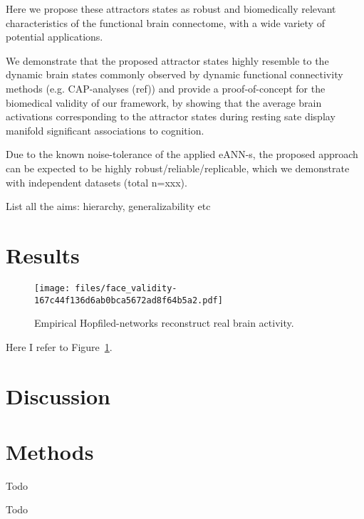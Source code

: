 \documentclass{article}
\begin{document}
Here we propose these attractors states as robust and biomedically relevant characteristics of the functional brain connectome, with a wide variety of potential applications.

We demonstrate that the proposed attractor states highly resemble to the dynamic brain states commonly observed by dynamic functional connectivity methods (e.g. CAP-analyses (ref)) and provide a proof-of-concept for the biomedical validity of our framework, by showing that the average brain activations corresponding to the attractor states during resting sate display manifold significant associations to cognition.

Due to the known noise-tolerance of the applied eANN-s, the proposed approach can be expected to be highly robust/reliable/replicable, which we demonstrate with independent datasets (total n=xxx).

List all the aims: hierarchy, generalizability etc

\section{Results}\label{Results}

\begin{figure}[!htbp]
\centering
\texttt{[image: files/face\_validity-167c44f136d6ab0bca5672ad8f64b5a2.pdf]}
\caption{Empirical Hopfiled-networks reconstruct real brain activity.}
\label{face-val}
\end{figure}

Here I refer to Figure~\ref{face-val}.

\section{Discussion}\label{Discussion}

\section{Methods}\label{Methods}

Todo

Todo

\clearpage

\end{document}
